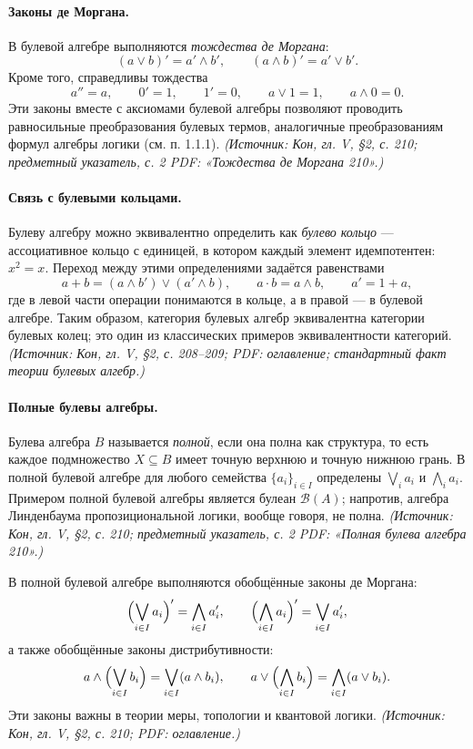 \documentclass[a4paper,12pt]{article}
\begin{document}
\paragraph{Законы де Моргана.}
В булевой алгебре выполняются \emph{тождества де Моргана}:
\[
(a\vee b)'=a'\wedge b',
\qquad
(a\wedge b)'=a'\vee b'.
\]
Кроме того, справедливы тождества
\[
a''=a,\qquad 0'=1,\qquad 1'=0,\qquad
a\vee1=1,\qquad a\wedge0=0.
\]
Эти законы вместе с аксиомами булевой алгебры позволяют проводить равносильные преобразования булевых термов, аналогичные преобразованиям формул алгебры логики (см. п. 1.1.1).
\textit{(Источник: Кон, гл. V, §2, с. 210; предметный указатель, с. 2 PDF: «Тождества де Моргана 210».)}

\paragraph{Связь с булевыми кольцами.}
Булеву алгебру можно эквивалентно определить как \emph{булево кольцо} — ассоциативное кольцо с единицей, в котором каждый элемент идемпотентен: \(x^2=x\). Переход между этими определениями задаётся равенствами
\[
a+b=(a\wedge b')\vee(a'\wedge b),
\qquad
a\cdot b=a\wedge b,
\qquad
a'=1+a,
\]
где в левой части операции понимаются в кольце, а в правой — в булевой алгебре. Таким образом, категория булевых алгебр эквивалентна категории булевых колец; это один из классических примеров эквивалентности категорий.
\textit{(Источник: Кон, гл. V, §2, с. 208--209; PDF: оглавление; стандартный факт теории булевых алгебр.)}

\paragraph{Полные булевы алгебры.}
Булева алгебра \(B\) называется \emph{полной}, если она полна как структура, то есть каждое подмножество \(X\subseteq B\) имеет точную верхнюю и точную нижнюю грань. В полной булевой алгебре для любого семейства \(\{a_i\}_{i\in I}\) определены \(\bigvee_i a_i\) и \(\bigwedge_i a_i\). Примером полной булевой алгебры является булеан \(\mathcal{B}(A)\); напротив, алгебра Линденбаума пропозициональной логики, вообще говоря, не полна.
\textit{(Источник: Кон, гл. V, §2, с. 210; предметный указатель, с. 2 PDF: «Полная булева алгебра 210».)}

В полной булевой алгебре выполняются обобщённые законы де Моргана:
\[
\Bigl(\bigvee_{i\in I}a_i\Bigr)'=\bigwedge_{i\in I}a_i',
\qquad
\Bigl(\bigwedge_{i\in I}a_i\Bigr)'=\bigvee_{i\in I}a_i',
\]
а также обобщённые законы дистрибутивности:
\[
a\wedge\Bigl(\bigvee_{i\in I}b_i\Bigr)=\bigvee_{i\in I}(a\wedge b_i),
\qquad
a\vee\Bigl(\bigwedge_{i\in I}b_i\Bigr)=\bigwedge_{i\in I}(a\vee b_i).
\]
Эти законы важны в теории меры, топологии и квантовой логики.
\textit{(Источник: Кон, гл. V, §2, с. 210; PDF: оглавление.)}
\end{document}
